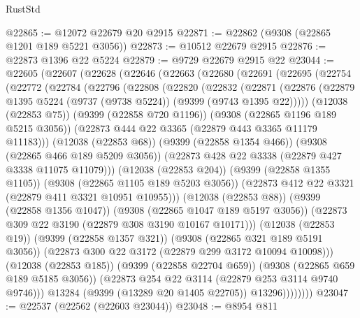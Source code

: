 \begin{lexlean}{RustStd}
\begin{coremodule}
@22865 := @12072 @22679 @20 @2915
@22871 := @22862 (@9308 (@22865 @1201 @189 @5221 @3056))
@22873 := @10512 @22679 @2915
@22876 := @22873 @1396 @22 @5224
@22879 := @9729 @22679 @2915 @22
@23044 := @22605
    (@22607
      (@22628
        (@22646
          (@22663
            (@22680
              (@22691
                (@22695
                  (@22754
                    (@22772
                      (@22784
                        (@22796
                          (@22808
                            (@22820
                              (@22832
                                (@22871
                                  (@22876
                                    (@22879
                                      @1395
                                      @5224
                                      (@9737 (@9738 @5224))
                                      (@9399 (@9743 @1395 @22)))))
                                (@12038 (@22853 @75))
                                (@9399 (@22858 @720 @1196))
                                (@9308 (@22865 @1196 @189 @5215 @3056))
                                (@22873 @444 @22 @3365 (@22879 @443 @3365 @11179 @11183)))
                              (@12038 (@22853 @68))
                              (@9399 (@22858 @1354 @466))
                              (@9308 (@22865 @466 @189 @5209 @3056))
                              (@22873 @428 @22 @3338 (@22879 @427 @3338 @11075 @11079)))
                            (@12038 (@22853 @204))
                            (@9399 (@22858 @1355 @1105))
                            (@9308 (@22865 @1105 @189 @5203 @3056))
                            (@22873 @412 @22 @3321 (@22879 @411 @3321 @10951 @10955)))
                          (@12038 (@22853 @88))
                          (@9399 (@22858 @1356 @1047))
                          (@9308 (@22865 @1047 @189 @5197 @3056))
                          (@22873 @309 @22 @3190 (@22879 @308 @3190 @10167 @10171)))
                        (@12038 (@22853 @19))
                        (@9399 (@22858 @1357 @321))
                        (@9308 (@22865 @321 @189 @5191 @3056))
                        (@22873 @300 @22 @3172 (@22879 @299 @3172 @10094 @10098)))
                      (@12038 (@22853 @185))
                      (@9399 (@22858 @22704 @659))
                      (@9308 (@22865 @659 @189 @5185 @3056))
                      (@22873 @254 @22 @3114 (@22879 @253 @3114 @9740 @9746)))
                    @13284
                    (@9399 (@13289 @20 @1405 @22705))
                    @13296))))))))
@23047 := @22537 (@22562 (@22603 @23044))
@23048 := @8954 @811

\end{coremodule}
\end{lexlean}
